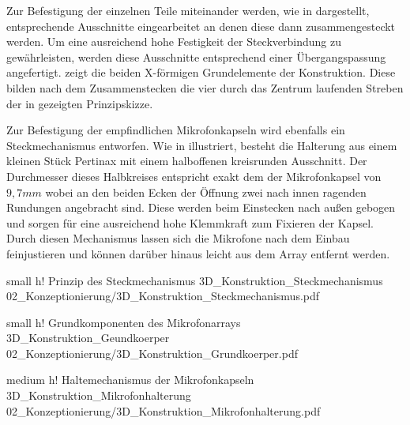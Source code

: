 Zur Befestigung der einzelnen Teile miteinander werden, wie in  dargestellt, entsprechende Ausschnitte eingearbeitet an denen diese dann zusammengesteckt werden. Um eine ausreichend hohe Festigkeit der Steckverbindung zu gewährleisten, werden diese Ausschnitte entsprechend einer Übergangspassung angefertigt.  zeigt die beiden X-förmigen Grundelemente der Konstruktion. Diese bilden nach dem Zusammenstecken die vier durch das Zentrum laufenden Streben der in  gezeigten Prinzipskizze.

Zur Befestigung der empfindlichen Mikrofonkapseln wird ebenfalls ein Steckmechanismus entworfen. Wie in  illustriert, besteht die Halterung aus einem kleinen Stück Pertinax mit einem halboffenen kreisrunden Ausschnitt. Der Durchmesser dieses Halbkreises entspricht exakt dem der Mikrofonkapsel von $9,7mm$ wobei an den beiden Ecken der Öffnung zwei nach innen ragenden Rundungen angebracht sind. Diese werden beim Einstecken nach außen gebogen und sorgen für eine ausreichend hohe Klemmkraft zum Fixieren der Kapsel. Durch diesen Mechanismus lassen sich die Mikrofone nach dem Einbau feinjustieren und können darüber hinaus leicht aus dem Array entfernt werden.




         {small}                 %
         {h!}             %
         {Prinzip des Steckmechanismus}                %
         {3D_Konstruktion_Steckmechanismus}                %
         {02_Konzeptionierung/3D_Konstruktion_Steckmechanismus.pdf}     %




         {small}                 %
         {h!}             %
         {Grundkomponenten des Mikrofonarrays}                %
         {3D_Konstruktion_Geundkoerper}                %
         {02_Konzeptionierung/3D_Konstruktion_Grundkoerper.pdf}     %


         {medium}                 %
         {h!}             %
         {Haltemechanismus der Mikrofonkapseln}                %
         {3D_Konstruktion_Mikrofonhalterung}                %
         {02_Konzeptionierung/3D_Konstruktion_Mikrofonhalterung.pdf}     %




